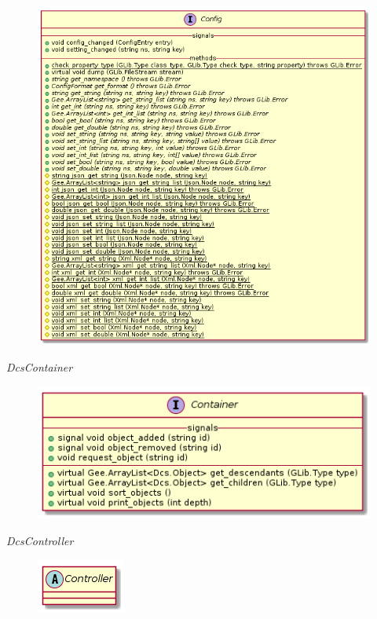         \begin{figure}[H]
          \includegraphics{figures/design/class/core/config}
        \end{figure}

      \emph{DcsContainer}

        \begin{figure}[H]
          \includegraphics{figures/design/class/core/container}
        \end{figure}

      \emph{DcsController}

        \begin{figure}[H]
          \includegraphics{figures/design/class/core/controller}
        \end{figure}


